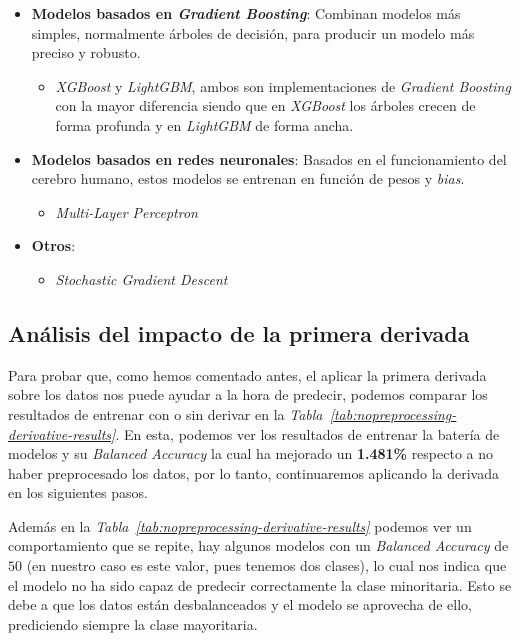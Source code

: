 \begin{itemize}
\begin{itemize}
        \end{itemize}
    \item \textbf{Modelos basados en \textit{Gradient Boosting}}: Combinan modelos más simples, normalmente árboles de decisión, para producir un modelo más preciso y robusto.\ \cite{Gradient97:online}
    \begin{itemize}
        \item \textit{XGBoost} y \textit{LightGBM}, ambos son implementaciones de \textit{Gradient Boosting} con la mayor diferencia siendo que en \textit{XGBoost} los árboles crecen de forma profunda y en \textit{LightGBM} de forma ancha. \cite{XGBoostv70:online}  
    \end{itemize}
    \item \textbf{Modelos basados en redes neuronales}: Basados en el funcionamiento del cerebro humano, estos modelos se entrenan en función de pesos y \textit{bias}.
        \begin{itemize}
            \item \textit{Multi-Layer Perceptron}
        \end{itemize}
    \item \textbf{Otros}:
    \begin{itemize}
        \item \textit{Stochastic Gradient Descent}
    \end{itemize}
\end{itemize}

\subsection{Análisis del impacto de la primera derivada}

Para probar que, como hemos comentado antes, el aplicar la primera derivada sobre los datos nos puede ayudar a la hora de predecir, podemos comparar los resultados de entrenar con o sin derivar en la \textit{Tabla\ \ref{tab:nopreprocessing-derivative-results}}. En esta, podemos ver los resultados de entrenar la batería de modelos y su \textit{Balanced Accuracy} la cual ha mejorado un \textbf{1.481\%} respecto a no haber preprocesado los datos, por lo tanto, continuaremos aplicando la derivada en los siguientes pasos.

Además en la \textit{Tabla\ \ref{tab:nopreprocessing-derivative-results}} podemos ver un comportamiento que se repite, hay algunos modelos con un \textit{Balanced Accuracy} de $50$ (en nuestro caso es este valor, pues tenemos dos clases), lo cual nos indica que el modelo no ha sido capaz de predecir correctamente la clase minoritaria. Esto se debe a que los datos están desbalanceados y el modelo se aprovecha de ello, prediciendo siempre la clase mayoritaria.


